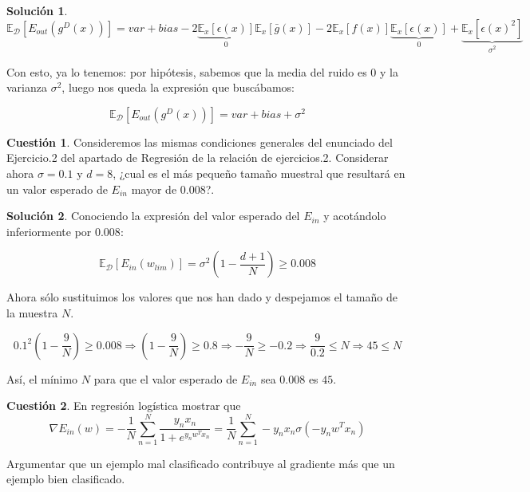\documentclass[a4paper, 11pt]{article}
\theoremstyle{definition}
\newtheorem{cuestion}{Cuestión}
\newtheorem*{solucion}{Solución}
\begin{document}
\begin{solucion}
    $$ \mathbb{E}_{\mathcal{D}}[E_{out}(g^D(x))] = var + bias -2 \underbrace{\mathbb{E}_x \left[ \epsilon(x) \right]}_{0} \mathbb{E}_x \left[\bar{g}(x) \right] - 2 \mathbb{E}_x \left[ f(x) \right] \underbrace{\mathbb{E}_x \left[ \epsilon(x) \right]}_{0} + \underbrace{\mathbb{E}_x \left[\epsilon(x)^2 \right]}_{\sigma^2} $$

    Con esto, ya lo tenemos: por hipótesis, sabemos que la media del ruido es 0 y la varianza $\sigma^2$, luego nos queda la expresión que buscábamos:

    $$ \mathbb{E}_{\mathcal{D}}[E_{out}(g^D(x))] = var + bias + \sigma^2 $$



  \end{solucion}

  \begin{cuestion}
    Consideremos las mismas condiciones generales del enunciado del Ejercicio.2 del apartado de Regresión de la relación de ejercicios.2. Considerar ahora $\sigma=0.1$ y $d=8$, ¿cual es el más pequeño tamaño muestral que resultará en un valor esperado de $E_{in}$ mayor de $0.008$?.
  \end{cuestion}


  \begin{solucion}
    Conociendo la expresión del valor esperado del $E_{in}$ y acotándolo inferiormente por $0.008$:

    $$\mathbb{E}_{\mathcal{D}} \left[ E_{in}(w_{lim})\right] = \sigma^2 \left(1 - \frac{d+1}{N}\right) \geq 0.008$$

    Ahora sólo sustituimos los valores que nos han dado y despejamos el tamaño de la muestra $N$.

    $$0.1^2 \left(1 - \frac{9}{N}\right) \geq 0.008 \Rightarrow \left(1 - \frac{9}{N}\right) \geq 0.8 \Rightarrow -\frac{9}{N} \geq -0.2 \Rightarrow \frac{9}{0.2} \leq N \Rightarrow 45 \leq N$$

    Así, el mínimo $N$ para que el valor esperado de $E_{in}$ sea $0.008$ es $45$.
  \end{solucion}

  \begin{cuestion}
    En regresión logística mostrar que
    \[
    \nabla E_{in}(w)=-\frac{1}{N}\sum_{n=1}^{N}\frac{y_nx_n}{1+e^{y_nw^Tx_n}}= \frac{1}{N}\sum_{n=1}^{N}-y_nx_n\sigma(-y_nw^Tx_n)
    \]

    Argumentar que un ejemplo mal clasificado contribuye  al gradiente más que un ejemplo bien clasificado.
  \end{cuestion}
\end{document}
